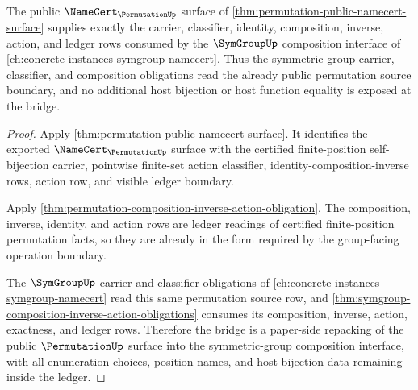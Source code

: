 \begin{theorem}\label{thm:permutation-symgroup-composition-bridge}
The public $\NameCert_{\PermutationUp}$ surface of \autoref{thm:permutation-public-namecert-surface} supplies exactly the carrier, classifier, identity, composition, inverse, action, and ledger rows consumed by the $\SymGroupUp$ composition interface of \autoref{ch:concrete-instances-symgroup-namecert}. Thus the symmetric-group carrier, classifier, and composition obligations read the already public permutation source boundary, and no additional host bijection or host function equality is exposed at the bridge.
\end{theorem}
\begin{proof}
Apply \autoref{thm:permutation-public-namecert-surface}. It identifies the exported $\NameCert_{\PermutationUp}$ surface with the certified finite-position self-bijection carrier, pointwise finite-set action classifier, identity-composition-inverse rows, action row, and visible ledger boundary.

Apply \autoref{thm:permutation-composition-inverse-action-obligation}. The composition, inverse, identity, and action rows are ledger readings of certified finite-position permutation facts, so they are already in the form required by the group-facing operation boundary.

The $\SymGroupUp$ carrier and classifier obligations of \autoref{ch:concrete-instances-symgroup-namecert} read this same permutation source row, and \autoref{thm:symgroup-composition-inverse-action-obligations} consumes its composition, inverse, action, exactness, and ledger rows. Therefore the bridge is a paper-side repacking of the public $\PermutationUp$ surface into the symmetric-group composition interface, with all enumeration choices, position names, and host bijection data remaining inside the ledger.
\end{proof}


